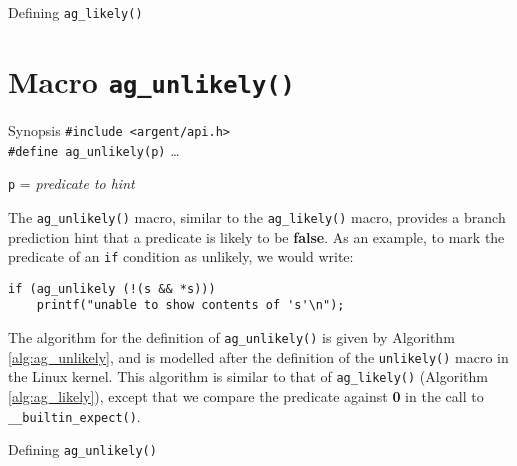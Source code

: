   \begin{algorithm}
    \scriptsize
    \caption{Defining \texttt{ag\_likely()}}
    \label{alg:ag_likely}
  \begin{algorithmic}
    \Else
    \EndIf
  \end{algorithmic}
  \end{algorithm}


%


\section{Macro \texttt{ag\_unlikely()}}

\begin{bclogo}[logo=\bccrayon, noborder=true, barre=snake, couleurBarre=gray]
  {Synopsis}
  \small
  \verb|#include <argent/api.h>| \\
  \verb|#define ag_unlikely(p)| \ldots \par
  \texttt{p} = \emph{predicate to hint}
\end{bclogo}

The \verb|ag_unlikely()| macro, similar to the \verb|ag_likely()| macro,
provides a branch prediction hint that a predicate is likely to be 
\textbf{false}. As an example, to mark the predicate of an \verb|if| condition 
as unlikely, we would write:

\begin{lstlisting}[linewidth=1.0\linewidth,
    caption=Example use of ag\_unlikely()]
if (ag_unlikely (!(s && *s))) 
    printf("unable to show contents of 's'\n");
\end{lstlisting}
 
 The algorithm for the definition of \verb|ag_unlikely()| is given by Algorithm
 \ref{alg:ag_unlikely}, and is modelled after the definition of the
 \verb|unlikely()| macro in the Linux kernel. This algorithm is similar to that
 of \verb|ag_likely()| (Algorithm \ref{alg:ag_likely}), except that we compare
 the predicate against \textbf{0} in the call to \verb|__builtin_expect()|.

  \begin{algorithm}
    \scriptsize
    \caption{Defining \texttt{ag\_unlikely()}}
    \label{alg:ag_unlikely}
  \begin{algorithmic}
    \Else
    \EndIf
  \end{algorithmic}
  \end{algorithm}


